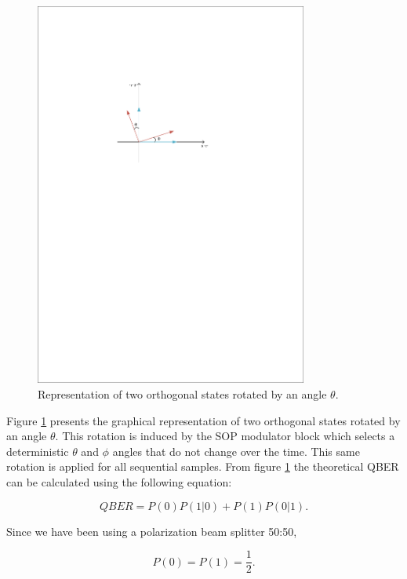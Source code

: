 \begin{refsection}
\begin{figure}[h]
    \centering
        \includegraphics[clip, trim=4cm 17.0cm 5cm 5cm, width=0.80\textwidth]{./sdf/bb84_with_discrete_variables/figures/prob_qber.pdf}
    \caption{Representation of two orthogonal states rotated by an angle $\theta$.}\label{rep_rotation}
\end{figure}

Figure \ref{rep_rotation} presents the graphical representation of two orthogonal states rotated by an angle $\theta$. This rotation is induced by the SOP modulator block which selects a deterministic $\theta$ and $\phi$ angles that do not change over the time. This same rotation is applied for all sequential samples. From figure \ref{rep_rotation} the theoretical QBER can be calculated using the following equation:

\begin{equation}\label{eq:qber}
  QBER = P(0)P(1|0)+P(1)P(0|1).
\end{equation}

Since we have been using a polarization beam splitter 50:50,

\begin{equation*}
  P(0) = P(1) = \frac{1}{2}.
\end{equation*}


\end{refsection}
